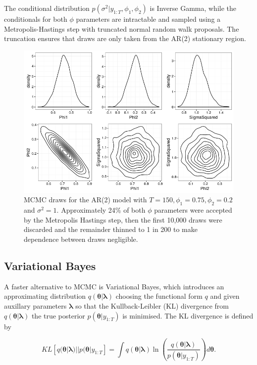 \documentclass[12pt,a4paper]{article}%
\numberwithin{equation}{section}
\begin{document}
The conditional distribution $p(\sigma^2 | y_{1:T}, \phi_1, \phi_2)$ is Inverse Gamma, while the conditionals for both $\phi$ parameters are intractable and sampled using a Metropolis-Hastings step with truncated normal random walk proposals. The truncation ensures that draws are only taken from the AR(2) stationary region.

\begin{figure}[h]
\centering
\includegraphics[scale = 0.6]{MCMC.png}
\caption{MCMC draws for the AR(2) model with $T = 150, \phi_1 = 0.75, \phi_2 = 0.2$ and $\sigma^2 = 1$. Approximately 24\% of both $\phi$ parameters were accepted by the Metropolis Hastings step, then the first 10,000 draws were discarded and the remainder thinned to 1 in 200 to make dependence between draws negligible.}
\label{MCMCplot}
\end{figure}

\subsection{Variational Bayes}

A faster alternative to MCMC is Variational Bayes, which introduces an approximating distribution $q(\boldsymbol{\theta} | \boldsymbol{\lambda})$ choosing the functional form $q$ and given auxillary parameters $\boldsymbol{\lambda}$ so that the Kullback-Leibler (KL) divergence \citep{Kullback1951} from $q(\boldsymbol{\theta} | \boldsymbol{\lambda})$ the true posterior $p(\boldsymbol{\theta} | y_{1:T})$ is minimised. The KL divergence is defined by

\begin{equation}
\label{KL-def}
KL[q(\boldsymbol{\theta} | \boldsymbol{\lambda})||p(\boldsymbol{\theta} | y_{1:T}] = \int q(\boldsymbol{\theta} | \boldsymbol{\lambda}) \ln \left( \frac{q(\boldsymbol{\theta} | \boldsymbol{\lambda})}{p(\boldsymbol{\theta} |y_{1:T})}\right) d\boldsymbol{\theta}.
\end{equation}
\end{document}
